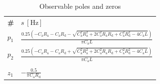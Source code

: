 \begin{table}[h]
\centering
\begin{tabular}[c]{ll}
\textbf{\#} & \textbf{$s\ [\mathrm{Hz}]$} \\ 
\rowcolor{myyellow}
$p_{1}$ &$\frac{0.25 \left(- C_{\mathrm{a}} R_{\mathrm{a}} - C_{\mathrm{a}} R_{\mathrm{d}} - \sqrt{C_{\mathrm{a}}^{2} R_{\mathrm{a}}^{2} + 2 C_{\mathrm{a}}^{2} R_{\mathrm{a}} R_{\mathrm{d}} + C_{\mathrm{a}}^{2} R_{\mathrm{d}}^{2} - 4 C_{\mathrm{a}} L}\right)}{\pi C_{\mathrm{a}} L}$ \\ 
$p_{2}$ &$\frac{0.25 \left(- C_{\mathrm{a}} R_{\mathrm{a}} - C_{\mathrm{a}} R_{\mathrm{d}} + \sqrt{C_{\mathrm{a}}^{2} R_{\mathrm{a}}^{2} + 2 C_{\mathrm{a}}^{2} R_{\mathrm{a}} R_{\mathrm{d}} + C_{\mathrm{a}}^{2} R_{\mathrm{d}}^{2} - 4 C_{\mathrm{a}} L}\right)}{\pi C_{\mathrm{a}} L}$ \\ 
\rowcolor{myyellow}
\small{ } \\ 
$z_{1}$ &$- \frac{0.5}{\pi C_{\mathrm{a}} R_{\mathrm{d}}}$ \\ 
\end{tabular}
\caption{Observable poles and  zeros}
\end{table}


